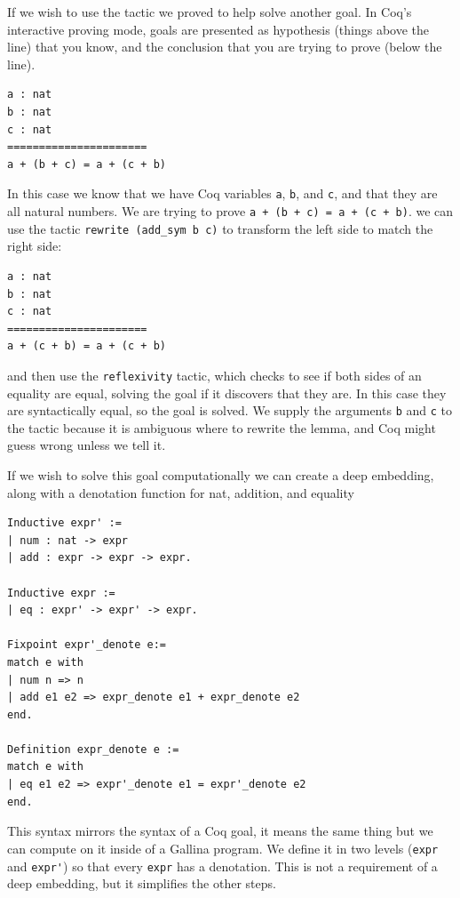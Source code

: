 \documentclass{puthesis}
\begin{document}
If we wish to use the tactic we proved to help solve another goal. In
Coq's interactive proving mode, goals are presented as hypothesis
(things above the line) that you know, and the conclusion that you are
trying to prove (below the line). 

\begin{lstlisting}
a : nat
b : nat
c : nat
======================
a + (b + c) = a + (c + b) 
\end{lstlisting}

In this case we know that we have Coq variables \lstinline|a|,
\lstinline|b|, and \lstinline|c|, and that they are all natural
numbers. We are trying to prove \lstinline|a + (b + c) = a + (c + b)|.
we can use the tactic \lstinline|rewrite (add_sym b c)|
to transform the left side to match the right side:

\begin{lstlisting}
a : nat
b : nat
c : nat
======================
a + (c + b) = a + (c + b) 
\end{lstlisting}

\noindent and then use the \lstinline|reflexivity| tactic, which
checks to see if both sides of an equality are equal, solving the goal
if it discovers that they are. In this case they are syntactically
equal, so the goal is solved. We supply the arguments \lstinline|b|
and \lstinline|c| to the tactic because it is ambiguous where to
rewrite the lemma, and Coq might guess wrong unless we tell it.

If we wish to solve this goal computationally we can create a deep
embedding, along with a denotation function for nat, addition, and
equality
\pagebreak
\begin{lstlisting}
Inductive expr' :=
| num : nat -> expr
| add : expr -> expr -> expr.

Inductive expr :=
| eq : expr' -> expr' -> expr.

Fixpoint expr'_denote e:=
match e with
| num n => n
| add e1 e2 => expr_denote e1 + expr_denote e2
end.

Definition expr_denote e :=
match e with
| eq e1 e2 => expr'_denote e1 = expr'_denote e2
end.
\end{lstlisting} 

This syntax mirrors the syntax of a Coq goal, it means the same thing
but we can compute on it inside of a Gallina program. We define it in
two levels (\lstinline|expr| and \lstinline|expr'|) so that every
\lstinline|expr| has a denotation. This is not a requirement of a
deep embedding, but it simplifies the other steps.
\end{document}
